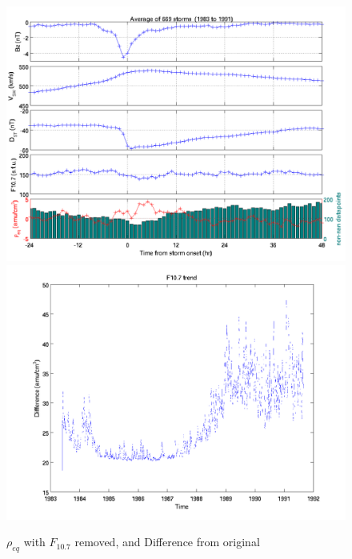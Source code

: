 \documentclass[10pt,twocolumn]{article}
\begin{document}
\begin{figure}[htp!]
\centering
\includegraphics[scale=0.7]{paperfigures/stormavs-dst-nof107.png}
\includegraphics[scale=0.7]{paperfigures/f107removed.png}
\caption{$\rho_{eq}$ with $F_{10.7}$ removed, and Difference from original}
\label{nof107}
\end{figure}
\clearpage
\end{document}
